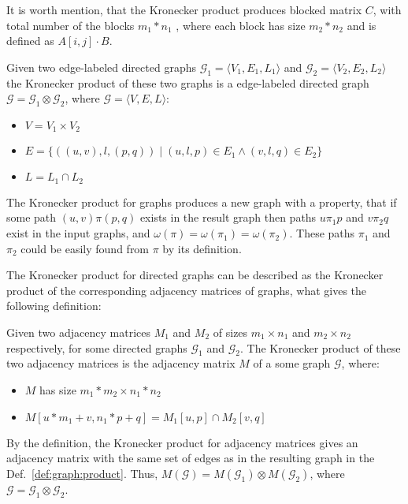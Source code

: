 It is worth mention, that the Kronecker product produces blocked matrix $C$, 
with total number of the blocks $m_1 * n_1$ , where each block has size 
$m_2 * n_2$ and is defined as $A[i,j] \cdot B$.

\begin{definition}
\label{def:graph:product}
Given two edge-labeled directed graphs $\mathcal{G}_1=\langle V_1, E_1, L_1 \rangle$ 
and $\mathcal{G}_2=\langle V_2, E_2, L_2 \rangle$ 
the Kronecker product of these two graphs is a edge-labeled directed graph
$\mathcal{G}=\mathcal{G}_1 \otimes \mathcal{G}_2$, 
where $\mathcal{G}= \langle V, E, L \rangle$:
\begin{itemize}
    \item $V = V_1 \times V_2$
    \item $E = \{((u,v),l,(p,q)) \mid (u,l,p) \in E_1 \wedge (v,l,q) \in E_2 \}$
    \item $L = L_1 \cap L_2$
\end{itemize}
\end{definition}

The Kronecker product for graphs produces a new graph with a property, 
that if some path $(u,v)\pi(p,q)$ exists in the result graph
then paths $u\pi_1p$ and $v\pi_2q$ exist in the input graphs, 
and $\omega(\pi) = \omega(\pi_1) = \omega(\pi_2)$. 
These paths $\pi_1$ and $\pi_2$ could be easily found from $\pi$ by its definition.

The Kronecker product for directed graphs can be described as 
the Kronecker product of the corresponding adjacency matrices of graphs, 
what gives the following definition:

\begin{definition}
Given two adjacency matrices $M_1$ and $M_2$ of sizes 
$m_1 \times n_1$ and $m_2 \times n_2$ respectively, 
for some directed graphs $\mathcal{G}_1$ and $\mathcal{G}_2$. 
The Kronecker product of these two adjacency matrices is the adjacency matrix $M$ 
of a some graph $\mathcal{G}$, where:
\begin{itemize}
    \item $M$ has size $m_1 * m_2 \times n_1 * n_2$
    \item $M[u * m_1 + v,n_1 * p + q] = M_1[u,p] \cap M_2[v,q]$
\end{itemize}
\end{definition}

By the definition, the Kronecker product for adjacency matrices gives an 
adjacency matrix with the same set of edges as in the resulting graph in the
Def.~\ref{def:graph:product}. Thus, $M(\mathcal{G}) = M(\mathcal{G}_1) \otimes
M(\mathcal{G}_2)$, where $\mathcal{G} = \mathcal{G}_1 \otimes \mathcal{G}_2$.

